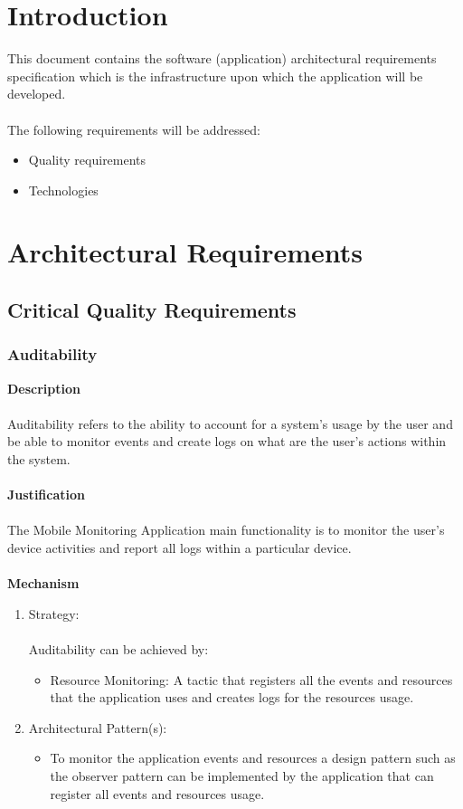 \documentclass[hidelinks, 12pt, oneside]{article}
\begin{document}
	
	\tableofcontents
	\newpage
	
	\section{Introduction}
	
	This document contains the software (application) architectural requirements specification which is the infrastructure upon which the application will be developed.\\\\
	The following requirements will be addressed:
	\begin{itemize}
		\item Quality requirements
		\item Technologies
	\end{itemize}	 
	\newpage
	\section{Architectural Requirements}
		\subsection{Critical Quality Requirements} 
			\subsubsection{Auditability}
			\textbf{Description} \\\\
			Auditability refers to the ability to account for a system's usage by the user and be able to monitor events and create logs on what are the user's actions within the system.\\\\
			\textbf{Justification}\\\\
			The Mobile Monitoring Application main functionality is to monitor the user's device activities and report all logs within a particular device.\\\\
			\textbf{Mechanism}
				\begin{enumerate}
					\item Strategy: \\\\
						Auditability can be achieved by:
						\begin{itemize}
							\item Resource Monitoring: A tactic that registers all the events and resources that the application uses and creates logs for the resources usage.  
						\end{itemize}
					\item Architectural Pattern(s):
						\begin{itemize}
							\item To monitor the application events and resources a design pattern such as the observer pattern can be implemented by the application that can register all events and resources usage. 
						\end{itemize}
				\end{enumerate}	
			\newpage
\end{document}
